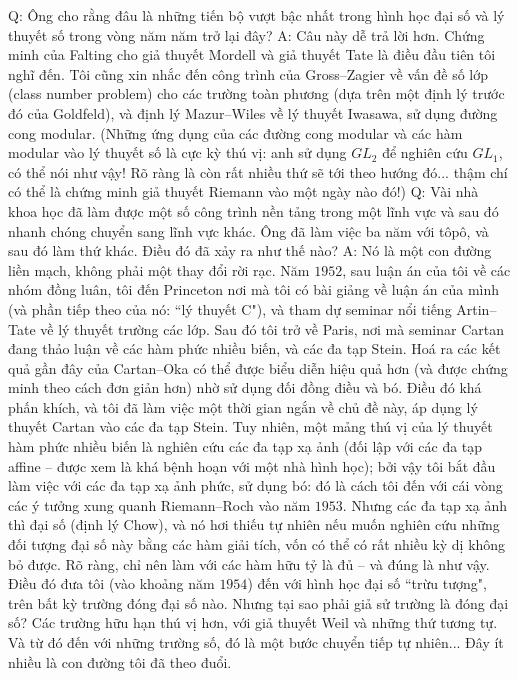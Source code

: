 \begin{multicols}{2}
	\vskip 0.1cm
	Q: Ông cho rằng đâu là những tiến bộ vượt bậc nhất trong hình học đại số và lý thuyết số trong vòng năm năm trở lại đây?
	\vskip 0.1cm
	A: Câu này dễ trả lời hơn. Chứng minh của Falting cho giả thuyết Mordell và giả thuyết Tate là điều đầu tiên tôi nghĩ đến. Tôi cũng xin nhắc đến công trình của Gross--Zagier về vấn đề số lớp (class number problem) cho các trường toàn phương (dựa trên một định lý trước đó của Goldfeld), và định lý Mazur--Wiles về lý thuyết Iwasawa, sử dụng đường cong modular. (Những ứng dụng của các đường cong modular và các hàm modular vào lý thuyết số là cực kỳ thú vị: anh sử dụng $GL_2$ để nghiên cứu $GL_1$, có thể nói như vậy! Rõ ràng là còn rất nhiều thứ sẽ tới theo hướng đó... thậm chí có thể là chứng minh giả thuyết Riemann vào một ngày nào đó!) 
	\vskip 0.1cm
	Q: Vài nhà khoa học đã làm được một số công trình nền tảng trong một lĩnh vực và sau đó nhanh chóng chuyển sang lĩnh vực khác. Ông đã làm việc ba năm với tôpô, và sau đó làm thứ khác. Điều đó đã xảy ra như thế nào?
	\vskip 0.1cm
	A: Nó là một con đường liền mạch, không phải một thay đổi rời rạc. Năm $1952$, sau luận án của tôi về các nhóm đồng luân, tôi đến Princeton nơi mà tôi có bài giảng về luận án của mình (và phần tiếp theo của nó: ``lý thuyết C"), và tham dự seminar nổi tiếng Artin--Tate về lý thuyết trường các lớp. 
	\vskip 0.1cm
	Sau đó tôi trở về Paris, nơi mà seminar Cartan đang thảo luận về các hàm phức nhiều biến, và các đa tạp Stein. Hoá ra các kết quả gần đây của Cartan--Oka có thể được biểu diễn hiệu quả hơn (và được chứng minh theo cách đơn giản hơn) nhờ sử dụng đối đồng điều và bó. Điều đó khá phấn khích, và tôi đã làm việc một thời gian ngắn về chủ đề này, áp dụng lý thuyết Cartan vào các đa tạp Stein. Tuy nhiên, một mảng thú vị của lý thuyết hàm phức nhiều biến là nghiên cứu các đa tạp xạ ảnh (đối lập với các đa tạp affine -- được xem là khá bệnh hoạn với một nhà hình học); bởi vậy tôi bắt đầu làm việc với các đa tạp xạ ảnh phức, sử dụng bó: đó là cách tôi đến với cái vòng các ý tưởng xung quanh Riemann--Roch vào năm $1953$. Nhưng các đa tạp xạ ảnh thì đại số (định lý Chow), và nó hơi thiếu tự nhiên nếu muốn nghiên cứu những đối tượng đại số này bằng các hàm giải tích, vốn có thể có rất nhiều kỳ dị không bỏ được. Rõ ràng, chỉ nên làm với các hàm hữu tỷ là đủ -- và đúng là như vậy. Điều đó đưa tôi (vào khoảng năm $1954$) đến với hình học đại số ``trừu tượng", trên bất kỳ trường đóng đại số nào. Nhưng tại sao phải giả sử trường là đóng đại số? Các trường hữu hạn thú vị hơn, với giả thuyết Weil và những thứ tương tự. Và từ đó đến với những trường số, đó là một bước chuyển tiếp tự nhiên... Đây ít nhiều là con đường tôi đã theo đuổi. 

\end{multicols}
